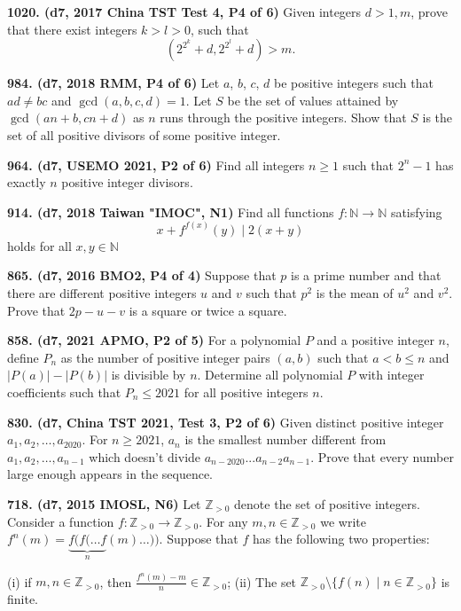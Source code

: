 \documentclass{article}
\begin{document}
\textbf{1020. (\color{red}d7\color{black}, 2017 China TST Test 4, P4 of 6)} Given integers $d>1,m$, prove that there exist integers $k>l>0$, such that $$(2^{2^k}+d,2^{2^l}+d)>m.$$

\textbf{984. (\color{red}d7\color{black}, 2018 RMM, P4 of 6)} Let $a$, $b$, $c$, $d$ be positive integers such that $ad \neq bc$ and $\gcd(a,b,c,d) = 1$. Let $S$ be the set of values attained by $\gcd(an+b,cn+d)$ as $n$ runs through the positive integers. Show that $S$ is the set of all positive divisors of some positive integer.

\textbf{964. (\color{red}d7\color{black}, USEMO 2021, P2 of 6)} Find all integers $n \geq 1$ such that $2^n - 1$ has exactly $n$ positive integer divisors.

\textbf{914. (\color{red}d7\color{black}, 2018 Taiwan "IMOC", N1)} Find all functions $f: \mathbb{N} \rightarrow \mathbb{N}$ satisfying
$$
    x+f^{f(x)}(y) \mid 2(x+y)
$$
holds for all $x, y \in \mathbb{N}$

\textbf{865. (\color{red}d7\color{black}, 2016 BMO2, P4 of 4)} Suppose that $p$ is a prime number and that there are different positive integers $u$ and $v$ such that $p^2$ is the mean of $u^2$ and $v^2$. Prove that $2p-u-v$ is a square or twice a square.

\textbf{858. (\color{red}d7\color{black}, 2021 APMO, P2 of 5)} For a polynomial $P$ and a positive integer $n$, define $P_{n}$ as the number of positive integer pairs $(a, b)$ such that $a<b \leq n$ and $|P(a)|-|P(b)|$ is divisible by
$n$. Determine all polynomial $P$ with integer coefficients such that $P_{n} \leq 2021$ for all positive integers $n$.

\textbf{830. (\color{red}d7\color{black}, China TST 2021, Test 3, P2 of 6)} Given distinct positive integer $ a_1,a_2,…,a_{2020} $. For $ n \ge 2021 $, $a_n$ is the smallest number different from $a_1,a_2,…,a_{n-1}$ which doesn't divide $a_{n-2020}...a_{n-2}a_{n-1}$. Prove that every number large enough appears in the sequence.

\textbf{718. (\color{red}d7\color{black}, 2015 IMOSL, N6)} Let $\mathbb{Z}_{>0}$ denote the set of positive integers. Consider a function $f: \mathbb{Z}_{>0} \to \mathbb{Z}_{>0}$. For any $m, n \in \mathbb{Z}_{>0}$ we write $f^n(m) = \underbrace{f(f(\ldots f}_{n}(m)\ldots))$. Suppose that $f$ has the following two properties:

(i) if $m, n \in \mathbb{Z}_{>0}$, then $\frac{f^n(m) - m}{n} \in \mathbb{Z}_{>0}$;
(ii) The set $\mathbb{Z}_{>0} \setminus \{f(n) \mid n\in \mathbb{Z}_{>0}\}$ is finite.
\end{document}
